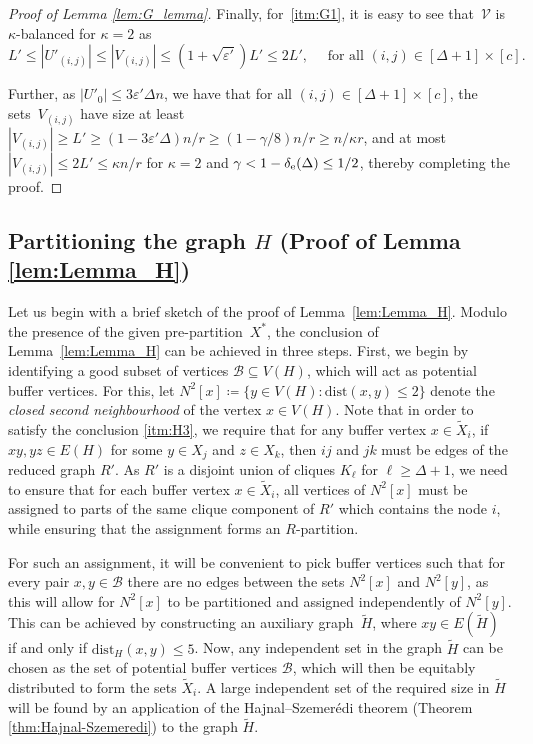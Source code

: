 \documentclass[final]{article}
\theoremstyle{definition}
\newcommand{\eps}{\varepsilon}
\newcommand{\dist}{\mathrm{dist}}
\newcommand{\exth}{\delta_{\rm e}(\Delta)}
\let\tilde\widetilde
\begin{document}
\begin{proof}[Proof of Lemma \ref{lem:G_lemma}]
Finally, for~\ref{itm:G1}, it is easy to see that~$\mathcal{V}$ is $\kappa$-balanced for $\kappa = 2$ as 
\[L' \leq |U'_{(i,j)}| \leq |V_{(i,j)}| \leq (1 + \sqrt{\eps'})L' \leq 2L', \quad \text{ for all } (i,j) \in [\Delta + 1]\times[c].\]

Further, as $|U'_0| \leq 3\eps'\Delta n$, we have that for all $(i,j) \in [\Delta+1]\times [c]$, the sets~$V_{(i,j)}$ have size at least $|V_{(i,j)}| \geq L' \geq (1 - 3\eps'\Delta)n/r \geq (1 - \gamma/8)n/r \geq n/\kappa r$, and at most $|V_{(i,j)}| \leq 2L' \leq \kappa n/r$ for $\kappa = 2$ and $\gamma < 1- \exth \leq 1/2$, thereby completing the proof. 
\end{proof}


\subsection{Partitioning the graph \texorpdfstring{$H$}{H} (Proof of Lemma \ref{lem:Lemma_H})}
\label{sec:robust_H_lemma}
 

Let us begin with a brief sketch of the proof of Lemma~\ref{lem:Lemma_H}. Modulo the presence of the given pre-partition~$X^*$, the conclusion of Lemma~\ref{lem:Lemma_H} can be achieved in three steps. First, we begin by identifying a good subset of vertices $\mathcal{B} \subseteq V(H)$, which will act as potential buffer vertices. For this, let $N^2[x] \coloneqq \{y \in V(H): \dist(x,y) \leq 2\}$ denote the \emph{closed second neighbourhood} of the vertex $x \in V(H)$. Note that in order to satisfy the conclusion \ref{itm:H3}, we require that for any buffer vertex $x \in \tilde{X}_i$, if $xy, yz \in E(H)$ for some $y\in X_j$ and $z \in X_k$, then $ij$ and $jk$ must be edges of the reduced graph $R'$. As $R'$ is a disjoint union of cliques $K_{\ell}$ for $\ell \geq \Delta+1$, we need to ensure that for each buffer vertex $x \in \tilde{X}_i$, all vertices of $N^2[x]$ must be assigned to parts of the same clique component of $R'$ which contains the node $i$, while ensuring that the assignment forms an $R$-partition. 

For such an assignment, it will be convenient to pick buffer vertices such that for every pair $x, y \in \mathcal{B}$ there are no edges between the sets $N^2[x]$ and $N^2[y]$, as this will allow for $N^2[x]$ to be partitioned and assigned independently of $N^2[y]$. This can be achieved by constructing an auxiliary graph~$\tilde{H}$, where $xy \in E(\tilde{H})$ if and only if $\dist_H(x,y) \leq 5$. Now, any independent set in the graph $\tilde{H}$ can be chosen as the set of potential buffer vertices $\mathcal{B}$, which will then be equitably distributed to form the sets $\tilde{X}_i$. A large independent set of the required size in $\tilde{H}$ will be found by an application of the Hajnal--Szemer\'{e}di theorem (Theorem \ref{thm:Hajnal-Szemeredi}) to the graph $\tilde{H}$. 
\end{document}
